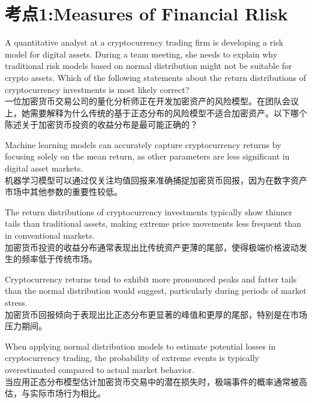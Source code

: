 \documentclass{article}
\newcounter{question} %
\begin{document}
 \tableofcontents %
\newpage




\iftrue
\section{考点1:Measures of Financial Rlisk}
\setcounter{question}{0}
\begin{question}
    A quantitative analyst at a cryptocurrency trading firm is developing a risk model for digital assets. During a team meeting, she needs to explain why traditional risk models based on normal distribution might not be suitable for crypto assets. Which of the following statements about the return distributions of cryptocurrency investments is most likely correct?
    \\一位加密货币交易公司的量化分析师正在开发加密资产的风险模型。在团队会议上，她需要解释为什么传统的基于正态分布的风险模型不适合加密资产。以下哪个陈述关于加密货币投资的收益分布是最可能正确的？
    \end{question}
    
    \begin{choices}
        \item Machine learning models can accurately capture cryptocurrency returns by focusing solely on the mean return, as other parameters are less significant in digital asset markets.\\
        机器学习模型可以通过仅关注均值回报来准确捕捉加密货币回报，因为在数字资产市场中其他参数的重要性较低。
        \item The return distributions of cryptocurrency investments typically show thinner tails than traditional assets, making extreme price movements less frequent than in conventional markets.\\
        加密货币投资的收益分布通常表现出比传统资产更薄的尾部，使得极端价格波动发生的频率低于传统市场。
        \item Cryptocurrency returns tend to exhibit more pronounced peaks and fatter tails than the normal distribution would suggest, particularly during periods of market stress.\\
        加密货币回报倾向于表现出比正态分布更显著的峰值和更厚的尾部，特别是在市场压力期间。
        \item When applying normal distribution models to estimate potential losses in cryptocurrency trading, the probability of extreme events is typically overestimated compared to actual market behavior.\\
        当应用正态分布模型估计加密货币交易中的潜在损失时，极端事件的概率通常被高估，与实际市场行为相比。
    \end{choices}
    
\end{document}
